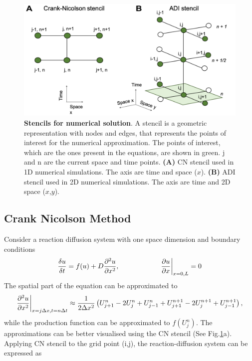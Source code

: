 \begin{figure}[H]

    \includegraphics[width=1\textwidth]{chapters/Methods/stencils}
    \caption{\textbf{Stencils for numerical solution}.  A stencil is a geometric representation with nodes and edges, that represents the points of interest for the numerical approximation. The points of interest, which are the ones present in the equations, are shown in green. j and n are the current space and time points. \textbf{(A)} \acrlong{CN} stencil used in 1D numerical simulations. The axis are time and space ($x$). \textbf{(B)} \acrshort{ADI} stencil used in 2D numerical simulations. The axis are time and 2D space ($x$,$y$).}
    \label{fig:stencils}
\end{figure}


\subsection{Crank Nicolson Method}\label{cranknicolson}
Consider a reaction diffusion system with one space dimension and boundary conditions
\begin{equation}
    \frac{\delta u}{\delta t} =  f(u) + D\frac{\partial^{2} {u}}{\partial {x}^{2}},   \quad \quad \quad \quad \quad \quad \pdv{u}{x}\biggr\rvert_{x=0,L}=0
\end{equation}
The spatial part of the equation can be approximated to
\begin{equation}
    \frac{\partial^{2} {u}}{\partial {x}^{2}} \biggr\rvert_{x=j\Delta x,t=n\Delta t} \approx \frac{1}{2\Delta x^{2}}\left( U^{n}_{j+1} -  2U^{n}_{j} + U^{n}_{j-1} + U^{n+1}_{j+1} - 2U^{n+1}_{j} + U^{n+1}_{j-1}\right),
\end{equation}
while the production function can be approximated to $f ( U^{n}_{j})$.  The approximations can be better visualised using the \acrshort{CN} stencil (See Fig.\ref{fig:stencils}a).
Applying \acrshort{CN} stencil to the grid point (i,j), the reaction-diffusion system can be expressed as


